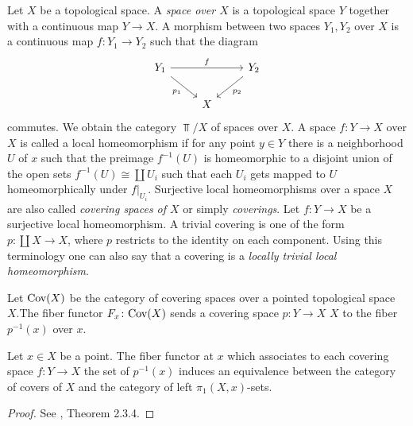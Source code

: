 \begin{remark}
	Let $X$ be a topological space. A \textit{space over $X$ } is a topological space $Y$ together with a continuous map $Y \to X$. A morphism between two spaces $Y_1, Y_2$ over $X$ is a continuous map $f: Y_1 \to Y_2$ such that the diagram
	\[
		\begin{tikzcd}
			{Y_1} && {Y_2} \\
			& X
			\arrow["f", from=1-1, to=1-3]
			\arrow["{p_2}", from=1-3, to=2-2]
			\arrow["{p_1}"', from=1-1, to=2-2]
		\end{tikzcd}
	\]
	commutes. We obtain the category $\Top/X$ of spaces over $X$. A space $f: Y \to X$ over $X$ is called a local homeomorphism if for any point $y \in Y$ there is a neighborhood $U$ of $x$ such that the preimage $f^{-1}(U)$ is homeomorphic to a disjoint union of the open sets $f^{-1}(U) \cong \coprod U_i$ such that each $U_i$ gets mapped to $U$ homeomorphically under $f|_{U_i}$. Surjective local homeomorphisms over a space $X$ are also called \textit{covering spaces of $X$} or simply \textit{coverings}. Let $f: Y \to X$ be a surjective local homeomorphism. A trivial covering is one of the form $p: \coprod X \to X$, where $p$ restricts to the identity on each component. Using this terminology one can also say that a covering is a \textit{locally trivial local homeomorphism}.
\end{remark}

\begin{definition}
	Let $\text{Cov}(X)$ be the category of covering spaces over a pointed topological space $X$.The fiber functor $F_x \colon \text{Cov}(X)$ sends a covering space $p \colon Y \to X$ $X$ to the fiber $p^{-1}(x)$ over $x$.
\end{definition}

\begin{theorem}\label{theorem:fiber_functor}
	Let $x \in  X$ be a point. The fiber functor at $x$ which associates to each covering space $f: Y \to X$ the set of $p^{-1}(x)$ induces an equivalence between the category of covers of $X$ and the category of left $\pi_1(X,x)$-sets.
\end{theorem}

\begin{proof}
	See \cite{Szamuely}, Theorem 2.3.4.
\end{proof}

